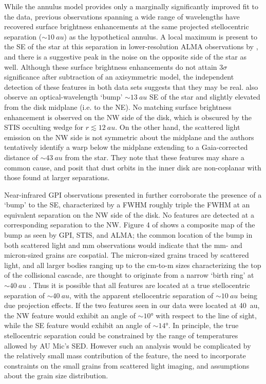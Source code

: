 \documentclass[modern]{aastex62}
\begin{document}
While the annulus model provides only a marginally significantly improved fit to the data, previous observations spanning a wide range of wavelengths have recovered surface brightness enhancements at the same projected stellocentric separation ($\sim \SI{10}{au}$) as the hypothetical annulus.
A local maximum is present to the SE of the star at this separation in lower-resolution ALMA observations by \citet{macgregor13}, and there is a suggestive peak in the noise on the opposite side of the star as well.
Although these surface brightness enhancements do not attain $3 \sigma$ significance after subtraction of an axisymmetric model, the independent detection of these features in both data sets suggests that they may be real.  
\citet{schneider14} also observe an optical-wavelength `bump' $\sim \SI{13}{au}$ SE of the star and slightly elevated from the disk midplane (i.e. to the NE).
No matching surface brightness enhancement is observed on the NW side of the disk, which is obscured by the STIS occulting wedge for $r \lesssim \SI{12}{au}$.
On the other hand, the scattered light emission on the NW side is not symmetric about the midplane and the authors tentatively identify a warp below the midplane extending to a Gaia-corrected distance of $\sim \SI{43}{au}$ from the star.
They note that these features may share a common cause, and posit that dust orbits in the inner disk are non-coplanar with those found at larger separations.

Near-infrared GPI observations presented in \citet{wang15} further corroborate the presence of a `bump' to the SE, characterized by a FWHM roughly triple the FWHM at an equivalent separation on the NW side of the disk. 
No features are detected at a corresponding separation to the NW.
Figure 4 of \citet{wang15} shows a composite map of the bump as seen by GPI, STIS, and ALMA; the common location of the bump in both scattered light and mm observations would indicate that the mm- and micron-sized grains are cospatial.
The micron-sized grains traced by scattered light, and all larger bodies ranging up to the cm-to-m sizes characterizing the top of the collisional cascade, are thought to originate from a narrow `birth ring' at $\sim \SI{40}{au}$ \citep{strubbe&chiang06}. 
Thus it is possible that all features are located at a true stellocentric separation of $\sim \SI{40}{au}$, with the apparent stellocentric separation of $\sim \SI{10}{au}$ being due projection effects.
If the two features seen in our data were located at \SI{40}{au}, the NW feature would exhibit an angle of $\sim \ang{10}$ with respect to the line of sight, while the SE feature would exhibit an angle of $\sim \ang{14}$.
In principle, the true stellocentric separation could be constrained by the range of temperatures allowed by AU Mic's SED. 
However such an analysis would be complicated by the relatively small mass contribution of the feature, the need to incorporate constraints on the small grains from scattered light imaging, and assumptions about the grain size distribution.
\end{document}
